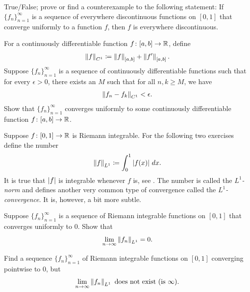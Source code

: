 \begin{exercise}
True/False; prove or find a counterexample to the following statement:
If $\{ f_n \}_{n=1}^\infty$ is a sequence of everywhere discontinuous functions on $[0,1]$
that converge uniformly to a function $f$, then $f$ is everywhere
discontinuous.
\end{exercise}

\begin{exercise} \label{c1uniflim:exercise}
For a continuously differentiable function $f \colon [a,b] \to {\mathbb{R}}$, define
\begin{equation*}
\left\lVert {f} \right\rVert_{C^1} \coloneqq \left\lVert {f} \right\rVert_{[a,b]} + \left\lVert {f'} \right\rVert_{[a,b]} .
\end{equation*}
Suppose $\{ f_n \}_{n=1}^\infty$ is a sequence of continuously differentiable
functions such that for every $\epsilon >0$, there exists an $M$
such that for all $n,k \geq M$, we have
\begin{equation*}
\left\lVert {f_n-f_k} \right\rVert_{C^1} < \epsilon .
\end{equation*}
Show that $\{ f_n \}_{n=1}^\infty$ converges uniformly to some continuously differentiable
function $f \colon [a,b] \to {\mathbb{R}}$.
\end{exercise}

\begin{exnote}
Suppose 
$f \colon [0,1] \to {\mathbb{R}}$ is Riemann integrable.
For the following two exercises define 
the number
\begin{equation*}
\left\lVert {f} \right\rVert_{L^1} \coloneqq 
\int_0^1 \left\lvert {f(x)} \right\rvert\,dx .
\end{equation*}
It is true that $\left\lvert {f} \right\rvert$ is integrable whenever $f$ is, see
.
The number is called the \emph{$L^1$-norm} and
defines another very common type of
convergence called the
\emph{$L^1$-convergence}.
It is, however, a bit more subtle.
\end{exnote}

\begin{exercise}
Suppose $\{ f_n \}_{n=1}^\infty$ is a sequence of Riemann integrable functions on $[0,1]$
that converges uniformly
to $0$.  Show that
\begin{equation*}
\lim_{n\to\infty} \left\lVert {f_n} \right\rVert_{L^1} = 0 .
\end{equation*}
\end{exercise}

\begin{exercise}
Find a sequence $\{ f_n \}_{n=1}^\infty$ of Riemann integrable functions 
on $[0,1]$ converging pointwise to $0$, but
\begin{equation*}
\lim_{n\to\infty} \left\lVert {f_n} \right\rVert_{L^1} \text{ does not exist (is } \infty\text{)}.
\end{equation*}
\end{exercise}

